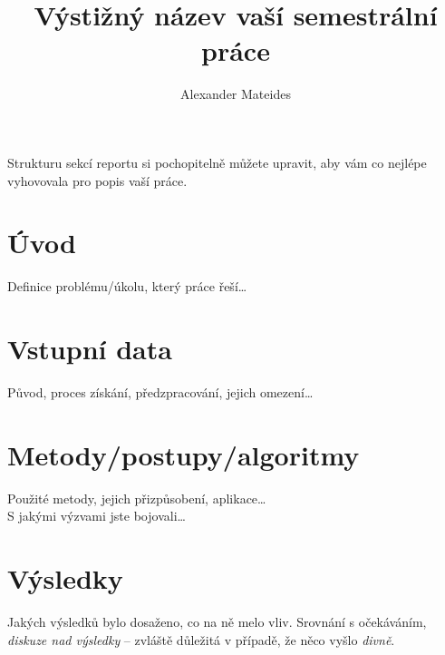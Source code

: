 \documentclass[czech]{pyt-report}
\title{Výstižný název vaší semestrální práce}
\author{Alexander Mateides}
\affiliation{ČVUT--FIT}
\begin{document}
\maketitle

Strukturu sekcí reportu si pochopitelně můžete upravit, aby vám co nejlépe vyhovovala pro popis vaší práce.

\section{Úvod}
Definice problému/úkolu, který práce řeší\ldots


\section{Vstupní data}
Původ, proces získání, předzpracování, jejich omezení\ldots

\section{Metody/postupy/algoritmy}
Použité metody, jejich přizpůsobení, aplikace\ldots \\
S jakými výzvami jste bojovali\ldots

\section{Výsledky}

Jakých výsledků bylo dosaženo, co na ně melo vliv. Srovnání s očekáváním, \emph{diskuze nad výsledky} -- zvláště důležitá v případě, že něco vyšlo \emph{divně}.
\end{document}
